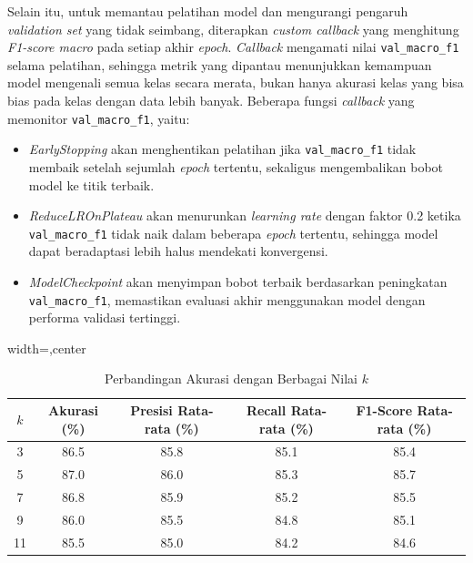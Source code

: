 \par Selain itu, untuk memantau pelatihan model dan mengurangi pengaruh \textit{validation set} yang tidak seimbang, diterapkan \textit{custom callback} yang menghitung \textit{F1-score macro} pada setiap akhir \textit{epoch}. \textit{Callback} mengamati nilai \texttt{val\_macro\_f1} selama pelatihan, sehingga metrik yang dipantau menunjukkan kemampuan model mengenali semua kelas secara merata, bukan hanya akurasi kelas yang bisa bias pada kelas dengan data lebih banyak. Beberapa fungsi \textit{callback} yang memonitor \texttt{val\_macro\_f1}, yaitu:
\begin{itemize}
  \item \textit{EarlyStopping} akan menghentikan pelatihan jika \texttt{val\_macro\_f1} tidak membaik setelah sejumlah \textit{epoch} tertentu, sekaligus mengembalikan bobot model ke titik terbaik.
  \item \textit{ReduceLROnPlateau} akan menurunkan \textit{learning rate} dengan faktor 0.2 ketika \texttt{val\_macro\_f1} tidak naik dalam beberapa \textit{epoch} tertentu, sehingga model dapat beradaptasi lebih halus mendekati konvergensi.
  \item \textit{ModelCheckpoint} akan menyimpan bobot terbaik berdasarkan peningkatan \texttt{val\_macro\_f1}, memastikan evaluasi akhir menggunakan model dengan performa validasi tertinggi.
\end{itemize}

\begin{table}[H]
\centering
\caption{Perbandingan Akurasi dengan Berbagai Nilai $ k $}
\label{tab:k_comparison}
\small %
\begin{adjustbox}{width=\textwidth,center}
\begin{tabular}{|c|c|c|c|c|}
\hline
$ k $ & \textbf{Akurasi (\%)} & \textbf{Presisi Rata-rata (\%)} & \textbf{Recall Rata-rata (\%)} & \textbf{F1-Score Rata-rata (\%)} \\
\hline
3   & 86.5    & 85.8    & 85.1    & 85.4 \\
5   & 87.0    & 86.0    & 85.3    & 85.7 \\
7   & 86.8    & 85.9    & 85.2    & 85.5 \\
9   & 86.0    & 85.5    & 84.8    & 85.1 \\
11  & 85.5    & 85.0    & 84.2    & 84.6 \\
\hline
\end{tabular}
\end{adjustbox}
\end{table}

